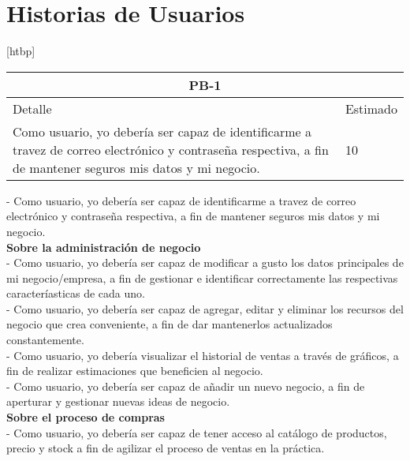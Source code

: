 
\chapter{Historias de Usuarios}[htbp]
\begin{table}
\begin{center}
\begin{tabular}{|p{12cm} | p{2cm} |}
	\hline
	\multicolumn{2}{|c|}{PB-1}\\
	\hline
	Detalle & Estimado \\
	\hline
	Como usuario, yo debería ser capaz de identificarme a travez de correo electrónico y contraseña respectiva, a fin de mantener seguros mis datos y mi negocio.  & 10 \\
	\hline	
\end{tabular}
\end{center}
\end{table}
- Como usuario, yo debería ser capaz de identificarme a travez de correo electrónico y contraseña respectiva, a fin de mantener seguros mis datos y mi negocio.\\
\textbf{Sobre la administración de negocio}\\
- Como usuario, yo debería ser capaz de modificar a gusto los datos principales de mi negocio/empresa, a fin de gestionar e identificar correctamente las respectivas caracteríasticas de cada uno.\\
- Como usuario, yo debería ser capaz de agregar, editar y eliminar los recursos del negocio que crea conveniente, a fin de dar mantenerlos actualizados constantemente.\\
- Como usuario, yo debería visualizar el historial de ventas a través de gráficos, a fin de realizar estimaciones que beneficien al negocio.\\
- Como usuario, yo debería ser capaz de añadir un nuevo negocio, a fin de aperturar y gestionar nuevas ideas de negocio.\\
\textbf{Sobre el proceso de compras}\\
- Como usuario, yo debería ser capaz de tener acceso al catálogo de productos, precio y stock a fin de agilizar el proceso de ventas en la práctica. 
